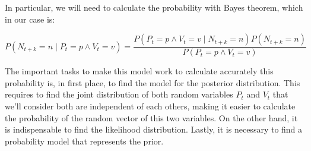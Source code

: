 In particular, we will need to calculate the probability with Bayes theorem, which in our case is:

\begin{equation}
P({ N }_{ t+k }=n\mid { P }_{ t }=p\wedge { V }_{ t}=v)=\frac{P({ P }_{ t }=p\wedge { V }_{ t}=v\mid{ N }_{ t+k }=n)P({ N }_{ t+k }=n)}{P({ P }_{ t }=p\wedge { V }_{ t}=v)}
\end{equation}

The important tasks to make this model work to calculate accurately this probability is, in first place, to find the model for the posterior distribution. This requires to find the joint distribution of both random variables $P_t$ and $V_t$ that we'll consider both are independent of each others, making it easier to calculate the probability of the random vector of this two variables. On the other hand, it is indispensable to find the likelihood distribution. Lastly, it is necessary to find a probability model that represents the prior.